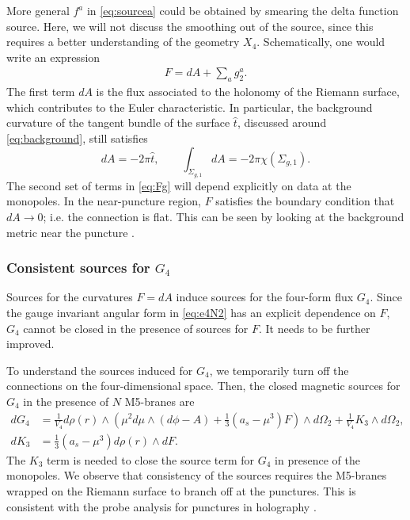 \documentclass[a4paper,11pt]{article}
\begin{document}
More general $f^a$  in \eqref{eq:sourcea} could be obtained by smearing the delta function source. Here, we will not discuss the smoothing out of the source, since this requires a better understanding of the geometry $X_4$. Schematically, one would write an expression 
\begin{align}
F = dA + \sum_a g_2^a.  \label{eq:Fg}
\end{align} 
The first term $dA$ is the flux associated to the holonomy of the Riemann surface, which contributes to the Euler characteristic. In particular, the background curvature of the tangent bundle of the surface $\hat{t}$, discussed around \eqref{eq:background}, still satisfies 
\begin{equation}
dA = -2\pi \hat{t}, \qquad \int_{\Sigma_{g,1}} dA = -2\pi \chi(\Sigma_{g,1} ).\label{eq:useful1}
\end{equation} 
The second set of terms in \eqref{eq:Fg} will depend explicitly on data at the monopoles. 
In the near-puncture region, $F$ satisfies the boundary condition that $dA\to 0$; i.e. the connection is flat.  This can be seen by looking at the background metric near the puncture \cite{Bah:2015fwa}. 












\subsubsection*{Consistent sources for $G_4$}


 Sources for the curvatures $F=dA$ induce sources for the four-form flux $G_4$.  Since the gauge invariant angular form in \eqref{eq:e4N2} has an explicit dependence on $F$, $G_4$ cannot be closed in the presence of sources for $F$.  It needs to be further improved.  

To understand the sources induced for $G_4$, we temporarily turn off the connections on the four-dimensional space.  Then, the closed magnetic sources for $G_4$ in the presence of $N$ M5-branes are
\begin{align}
d G_4 &=\frac{1}{V_4} d\rho(r) \wedge \left(\mu^2 d\mu \wedge \left(d \phi -A\right) + \frac{1}{3} \left(  a_s-\mu^3 \right) F \right) \wedge d\Omega_2 +\frac{1}{V_4}   K_3 \wedge d\Omega_2, \label{eq:sourceF}\\
d K_3 &= \frac{1}{3} \left( a_s - \mu^3\right) d\rho(r) \wedge dF.  
\end{align}  The $K_3$ term is needed to close the source term for $G_4$ in presence of the monopoles.  We observe that consistency of the sources requires the M5-branes wrapped on the Riemann surface to branch off at the punctures.   This is consistent with the probe analysis for punctures in holography \cite{Gaiotto:2009gz,Bah:2013wda}. 
\end{document}
